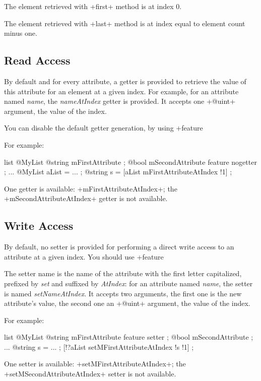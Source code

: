 The element retrieved with \ggs+first+ method is at index 0.

The element retrieved with \ggs+last+ method is at index equal to element count minus one.

\subsection{Read Access}

By default and for every attribute, a getter is provided to retrieve the value of this attribute for an element at a given index. For example, for an attribute named \emph{name}, the \emph{nameAtIndex} getter is provided. It accepts one \ggs+@uint+ argument, the value of the index.

You can disable the default getter generation, by using \ggs+feature %

For example:
\begin{galgas}
list @MyList {
  @string mFirstAttribute ;
  @bool mSecondAttribute feature nogetter ;
}
...
@MyList aList = ... ;
@string s = [aList mFirstAttributeAtIndex !1] ;
\end{galgas}

One getter is available: \ggs+mFirstAttributeAtIndex+; the \ggs+mSecondAttributeAtIndex+ getter is not available.


\subsection{Write Access}

By default, no setter is provided for performing a direct write access to an attribute at a given index. You should use \ggs+feature %

The setter name is the name of the attribute with the first letter capitalized, prefixed by \emph{set} and suffixed by \emph{AtIndex}: for an attribute named \emph{name}, the setter is named \emph{setNameAtIndex}. It accepts two arguments, the first one is the new attribute's value, the second one an \ggs+@uint+ argument, the value of the index.

For example:

\begin{galgas}
list @MyList {
  @string mFirstAttribute feature setter ;
  @bool mSecondAttribute ;
}
...
@string s = ... ;
[!?aList setMFirstAttributeAtIndex !s !1] ;
\end{galgas}

One setter is available: \ggs+setMFirstAttributeAtIndex+; the \ggs+setMSecondAttributeAtIndex+ setter is not available.

